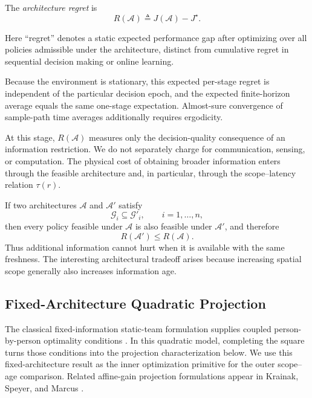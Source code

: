 \documentclass[11pt]{article}
\begin{document}
The \emph{architecture regret} is
\begin{equation}
    R(\mathcal{A})
    \triangleq
    J(\mathcal{A})-J^\star.
    \label{eq:architecture_regret}
\end{equation}

Here ``regret'' denotes a static expected performance gap after optimizing over
all policies admissible under the architecture, distinct from cumulative regret
in sequential decision making or online learning.

Because the environment is stationary, this expected per-stage regret is
independent of the particular decision epoch, and the expected finite-horizon
average equals the same one-stage expectation. Almost-sure convergence of
sample-path time averages additionally requires ergodicity.

At this stage, $R(\mathcal{A})$ measures only the decision-quality consequence
of an information restriction. We do not separately charge for communication,
sensing, or computation. The physical cost of obtaining broader information
enters through the feasible architecture and, in particular, through the
scope--latency relation $\tau(r)$.

If two architectures $\mathcal{A}$ and $\mathcal{A}'$ satisfy
\begin{equation}
    \mathcal{G}_i
    \subseteq
    \mathcal{G}'_i,
    \qquad
    i=1,\ldots,n,
    \label{eq:info_inclusion}
\end{equation}
then every policy feasible under $\mathcal{A}$ is also feasible under
$\mathcal{A}'$, and therefore
\begin{equation}
    R(\mathcal{A}')
    \le
    R(\mathcal{A}).
    \label{eq:architecture_monotonicity}
\end{equation}
Thus additional information cannot hurt when it is available with the same
freshness. The interesting architectural tradeoff arises because increasing
spatial scope generally also increases information age.

\subsection{Fixed-Architecture Quadratic Projection}
\label{subsec:projection}

The classical fixed-information static-team formulation supplies coupled
person-by-person optimality conditions \cite{radner1962team}. In this
quadratic model, completing the square turns those conditions into the
projection characterization below. We use this fixed-architecture result as the
inner optimization primitive for the outer scope--age comparison. Related
affine-gain projection formulations appear
in Krainak, Speyer, and Marcus \cite{krainak1982staticII}.
\end{document}
